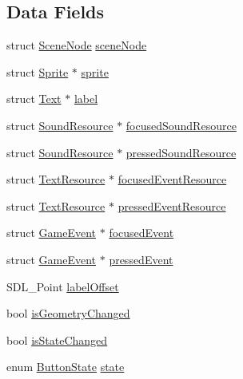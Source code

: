 \subsection*{Data Fields}
\begin{DoxyCompactItemize}
\item 
struct \hyperlink{struct_scene_node}{Scene\+Node} \hyperlink{struct_button_aca8025f56fb4ce20b974ec9a3292a9e4}{scene\+Node}
\item 
struct \hyperlink{struct_sprite}{Sprite} $\ast$ \hyperlink{struct_button_a1128327f94baacb1570a98fca0591108}{sprite}
\item 
struct \hyperlink{struct_text}{Text} $\ast$ \hyperlink{struct_button_ab278201aa1758916bc9e825b3833e31b}{label}
\item 
struct \hyperlink{struct_sound_resource}{Sound\+Resource} $\ast$ \hyperlink{struct_button_a8848ee5b886f588a966fc6c3ff0270df}{focused\+Sound\+Resource}
\item 
struct \hyperlink{struct_sound_resource}{Sound\+Resource} $\ast$ \hyperlink{struct_button_a9d6a7ab6b4708d54a3e7da0a665609b2}{pressed\+Sound\+Resource}
\item 
struct \hyperlink{struct_text_resource}{Text\+Resource} $\ast$ \hyperlink{struct_button_aff7dcf845e86b8d62077ceec6094f3e3}{focused\+Event\+Resource}
\item 
struct \hyperlink{struct_text_resource}{Text\+Resource} $\ast$ \hyperlink{struct_button_a4f009b181e2d1679d58eeb638c79f1f7}{pressed\+Event\+Resource}
\item 
struct \hyperlink{struct_game_event}{Game\+Event} $\ast$ \hyperlink{struct_button_af8909553495b609dc7c9efd469ffc31d}{focused\+Event}
\item 
struct \hyperlink{struct_game_event}{Game\+Event} $\ast$ \hyperlink{struct_button_a6c6350ebecb76824f44acd4af5310894}{pressed\+Event}
\item 
S\+D\+L\+\_\+\+Point \hyperlink{struct_button_ac8658f1193098d53c4bd1bdcab7df6af}{label\+Offset}
\item 
bool \hyperlink{struct_button_a8ea7e8ac3e3330830aa7a4309390f3ac}{is\+Geometry\+Changed}
\item 
bool \hyperlink{struct_button_abbe46dfeadc7ca8af4ccd6a1e60fa560}{is\+State\+Changed}
\item 
enum \hyperlink{_button_8h_aa46074d34fe2d6631c6bd9dc74633657}{Button\+State} \hyperlink{struct_button_a98525fefb11846bc0e1ee154b0a106d4}{state}
\end{DoxyCompactItemize}


